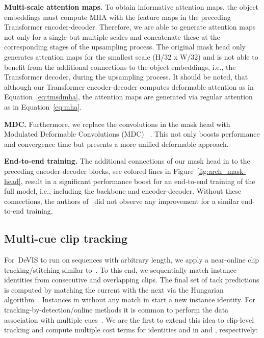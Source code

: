 \documentclass[runningheads]{llncs}
\newcommand{\evis}{\mbox{DeVIS}}
\newcommand{\ie}{i.e.}
\begin{document}
\noindent \textbf{Multi-scale attention maps.}
To obtain informative attention maps, the object embeddings must compute MHA with the feature maps in the preceding Transformer encoder-decoder.
Therefore, we are able to generate attention maps not only for a single but multiple scales and concatenate these at the corresponding stages of the upsampling process.
The original mask head only generates attention maps for the smallest scale (H/32 x W/32) and is not able to benefit from the additional connections to the object embeddings, \ie{}, the Transformer decoder, during the upsampling process.
It should be noted, that although our Transformer encoder-decoder computes deformable attention as in Equation~\ref{eq:tmsdmha}, the attention maps are generated via regular attention as in Equation~\ref{eq:mha}.

\noindent \textbf{MDC.}
Furthermore, we replace the convolutions in the mask head with Modulated Deformable Convolutions (MDC) ~\cite{zhu2018deformable}.
This not only boosts performance and convergence time but presents a more unified deformable approach. 

\noindent \textbf{End-to-end training.}
The additional connections of our mask head in to the preceding encoder-decoder blocks, see colored lines in Figure~\ref{fig:arch_mask-head}, result in a significant performance boost for an end-to-end training of the full model, \ie{}, including the backbone and encoder-decoder.
Without these connections, the authors of~\cite{DETR} did not observe any improvement for a similar end-to-end training.







\subsection{Multi-cue clip tracking}
For~\evis{} to run on sequences with arbitrary length, we apply a near-online clip tracking/stitching similar to~\cite{IFC,stem_seg,mask_prop}.
To this end, we sequentially match instance identities from consecutive and overlapping clips. 
The final set of tack predictions  is computed by matching the current  with the next  via the Hungarian algorithm~\cite{hungarian}.
Instances in  without any match in  start a new instance identity.
For tracking-by-detection/online methods it is common to perform the data association with multiple cues~\cite{Yang2019vis}.
We are the first to extend this idea to clip-level tracking and compute multiple cost terms for identities  and  in  and , respectively:
\end{document}
